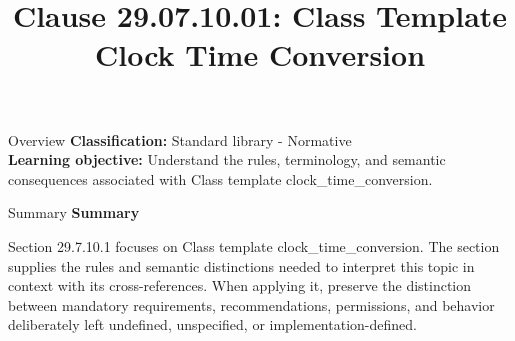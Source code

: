 \documentclass[10pt,letterpaper]{article}
\title{Clause 29.07.10.01: Class Template Clock Time Conversion}
\author{}
\date{}
\begin{document}
\maketitle
\begin{CornellOverviewBox}{Overview}
\textbf{Classification:} Standard library - Normative\\[2pt]
\textbf{Learning objective:} Understand the rules, terminology, and semantic consequences associated with Class template clock\_time\_conversion.
\end{CornellOverviewBox}\begin{CornellSummaryBox}{Summary}
{\sffamily\bfseries\color{Accent} Summary}\par\vspace{3pt}Section 29.7.10.1 focuses on Class template clock\_time\_conversion. The section supplies the rules and semantic distinctions needed to interpret this topic in context with its cross-references. When applying it, preserve the distinction between mandatory requirements, recommendations, permissions, and behavior deliberately left undefined, unspecified, or implementation-defined.
\end{CornellSummaryBox}
\end{document}
